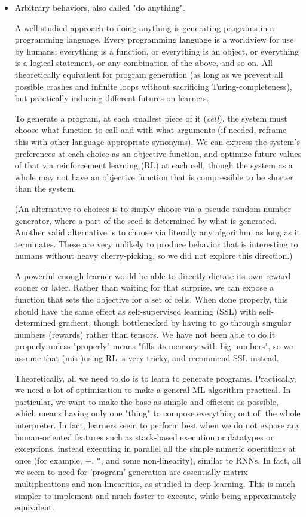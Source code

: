 \documentclass{article}
\begin{document}
\begin{itemize}
\item Arbitrary behaviors, also called "do anything".

A well-studied approach to doing anything is generating programs in a programming language. Every programming language is a worldview for use by humans: everything is a function, or everything is an object, or everything is a logical statement, or any combination of the above, and so on. All theoretically equivalent for program generation (as long as we prevent all possible crashes and infinite loops without sacrificing Turing-completeness), but practically inducing different futures on learners.

To generate a program, at each smallest piece of it (\textit{cell}), the system must choose what function to call and with what arguments (if needed, reframe this with other language-appropriate synonyms). We can express the system's preferences at each choice as an objective function, and optimize future values of that via reinforcement learning (RL) at each cell, though the system as a whole may not have an objective function that is compressible to be shorter than the system.

(An alternative to choices is to simply choose via a pseudo-random number generator, where a part of the seed is determined by what is generated. Another valid alternative is to choose via literally any algorithm, as long as it terminates. These are very unlikely to produce behavior that is interesting to humans without heavy cherry-picking, so we did not explore this direction.)

A powerful enough learner would be able to directly dictate its own reward sooner or later. Rather than waiting for that surprise, we can expose a function that sets the objective for a set of cells. When done properly, this should have the same effect as self-supervised learning (SSL) with self-determined gradient, though bottlenecked by having to go through singular numbers (rewards) rather than tensors. We have not been able to do it properly unless "properly" means "fills its memory with big numbers", so we assume that (mis-)using RL is very tricky, and recommend SSL instead.

Theoretically, all we need to do is to learn to generate programs. Practically, we need a lot of optimization to make a general ML algorithm practical. In particular, we want to make the base as simple and efficient as possible, which means having only one "thing" to compose everything out of: the whole interpreter. In fact, learners seem to perform best when we do not expose any human-oriented features such as stack-based execution or datatypes or exceptions, instead executing in parallel all the simple numeric operations at once (for example, $+$, $*$, and some non-linearity), similar to RNNs. In fact, all we seem to need for 'program' generation are essentially matrix multiplications and non-linearities, as studied in deep learning. This is much simpler to implement and much faster to execute, while being approximately equivalent.
\end{itemize}
\end{document}
